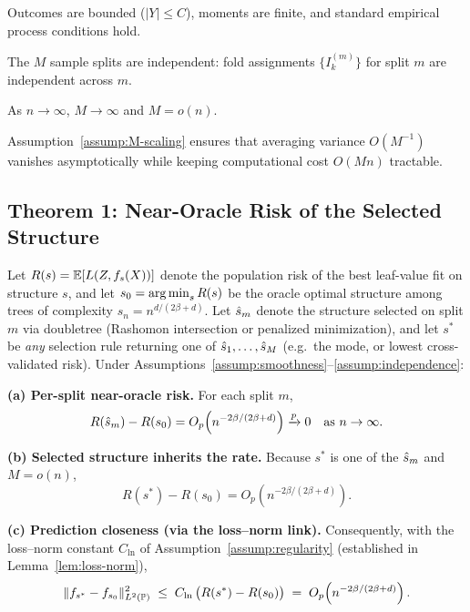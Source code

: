 \documentclass[12pt]{article}
\begin{document}
\begin{assumption}
\label{assump:regularity}
Outcomes are bounded ($|Y| \le C$), moments are finite, and standard empirical process conditions hold.
\end{assumption}

\begin{assumption}
\label{assump:independence}
The $M$ sample splits are independent: fold assignments $\{I_k^{(m)}\}$ for split $m$ are independent across $m$.
\end{assumption}

\begin{assumption}[M scaling]
\label{assump:M-scaling}
As $n \to \infty$, $M \to \infty$ and $M = o(n)$.
\end{assumption}

Assumption~\ref{assump:M-scaling} ensures that averaging variance $O(M^{-1})$ vanishes asymptotically while keeping computational cost $O(Mn)$ tractable.

\subsection{Theorem 1: Near-Oracle Risk of the Selected Structure}

\begin{theorem}
\label{thm:structure-consistency}
Let $R(s) = \mathbb{E}[L(Z, f_s(X))]$ denote the population risk of the best leaf-value fit on structure $s$, and let $s_0 = \operatorname*{arg\,min}_s R(s)$ be the oracle optimal structure among trees of complexity $s_n = n^{d/(2\beta+d)}$. Let $\hat{s}_m$ denote the structure selected on split $m$ via doubletree (Rashomon intersection or penalized minimization), and let $s^*$ be \emph{any} selection rule returning one of $\hat{s}_1,\dots,\hat{s}_M$ (e.g.\ the mode, or lowest cross-validated risk). Under Assumptions~\ref{assump:smoothness}--\ref{assump:independence}:

\textbf{(a) Per-split near-oracle risk.} For each split $m$,
\[
R(\hat{s}_m) - R(s_0) = O_p\!\left(n^{-2\beta/(2\beta+d)}\right) \xrightarrow{p} 0
\quad\text{as } n\to\infty.
\]

\textbf{(b) Selected structure inherits the rate.} Because $s^*$ is one of the $\hat{s}_m$ and $M=o(n)$,
\[
R(s^*) - R(s_0) = O_p\!\left(n^{-2\beta/(2\beta+d)}\right).
\]

\textbf{(c) Prediction closeness (via the loss--norm link).} Consequently, with the loss--norm constant $C_{\mathrm{ln}}$ of Assumption~\ref{assump:regularity} (established in Lemma~\ref{lem:loss-norm}),
\[
\|f_{s^*} - f_{s_0}\|_{L^2(\mathbb{P})}^2 \;\le\; C_{\mathrm{ln}}\,\bigl(R(s^*)-R(s_0)\bigr) \;=\; O_p\!\left(n^{-2\beta/(2\beta+d)}\right).
\]
\end{theorem}
\end{document}
